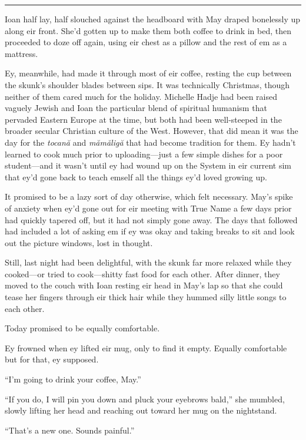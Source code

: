 \begin{center}\rule{0.5\linewidth}{0.5pt}\end{center}

Ioan half lay, half slouched against the headboard with May draped bonelessly up along eir front. She'd gotten up to make them both coffee to drink in bed, then proceeded to doze off again, using eir chest as a pillow and the rest of em as a mattress.

Ey, meanwhile, had made it through most of eir coffee, resting the cup between the skunk's shoulder blades between sips. It was technically Christmas, though neither of them cared much for the holiday. Michelle Hadje had been raised vaguely Jewish and Ioan the particular blend of spiritual humanism that pervaded Eastern Europe at the time, but both had been well-steeped in the broader secular Christian culture of the West. However, that did mean it was the day for the \emph{tocană} and \emph{mămăligă} that had become tradition for them. Ey hadn't learned to cook much prior to uploading—just a few simple dishes for a poor student—and it wasn't until ey had wound up on the System in eir current sim that ey'd gone back to teach emself all the things ey'd loved growing up.

It promised to be a lazy sort of day otherwise, which felt necessary. May's spike of anxiety when ey'd gone out for eir meeting with True Name a few days prior had quickly tapered off, but it had not simply gone away. The days that followed had included a lot of asking em if ey was okay and taking breaks to sit and look out the picture windows, lost in thought.

Still, last night had been delightful, with the skunk far more relaxed while they cooked—or tried to cook—shitty fast food for each other. After dinner, they moved to the couch with Ioan resting eir head in May's lap so that she could tease her fingers through eir thick hair while they hummed silly little songs to each other.

Today promised to be equally comfortable.

Ey frowned when ey lifted eir mug, only to find it empty. Equally comfortable but for that, ey supposed.

``I'm going to drink your coffee, May.''

``If you do, I will pin you down and pluck your eyebrows bald,'' she mumbled, slowly lifting her head and reaching out toward her mug on the nightstand.

``That's a new one. Sounds painful.''

